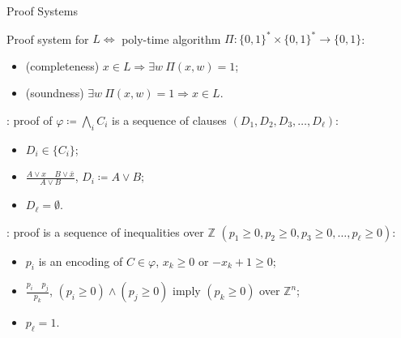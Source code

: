 \begin{frame}{Proof Systems}

    \begin{definition}
        Proof system for $L \Leftrightarrow$ poly-time algorithm
        $\Pi\colon \{0, 1\}^* \times \{0, 1\}^* \rightarrow \{0, 1\}$:
        \begin{itemize}
            \item (completeness) $x \in L \Rightarrow \exists w ~ \Pi(x, w) = 1$;
            \item (soundness) $\exists w ~ \Pi(x, w) = 1 \Rightarrow x \in L$.
        \end{itemize}
    \end{definition}

    : proof of $\varphi \coloneqq \bigwedge\limits_{i} C_i$ is a sequence of clauses
    $(D_1, D_2, D_3, \dots, D_{\ell})$:
    \pause
    
    \begin{minipage}{0.3\linewidth}
        \begin{itemize}
            \item $D_i \in \{C_i\}$;
                \pause
            \item $\frac{A \lor x ~~~~~ B \lor \bar{x}}{A \lor B}$, $D_i \coloneqq A \lor B$;
                \pause
            \item $D_{\ell} = \emptyset$.
        \end{itemize}
    \end{minipage}
    \pause
    \begin{minipage}{0.68\linewidth}
        \centering
        
    \end{minipage}


    \pause
    \vspace{0.3cm}

    : proof is a sequence of inequalities over $\mathbb{Z}$
    $(p_1 \ge 0, p_2 \ge 0, p_3 \ge 0, \dots, p_{\ell} \ge 0)$:
    \begin{itemize}
        \item $p_i$ is an encoding of $C \in \varphi$, $x_k \ge 0$ or $-x_k + 1 \ge 0$;
        \item $\frac{p_i ~~~~~ p_j}{p_k}$,  $(p_i \ge 0) \land (p_j \ge 0)$ imply $(p_k \ge 0)$
            \alert{over $\mathbb{Z}^n$};
        \item $p_{\ell} = 1$.
    \end{itemize}
\end{frame}

